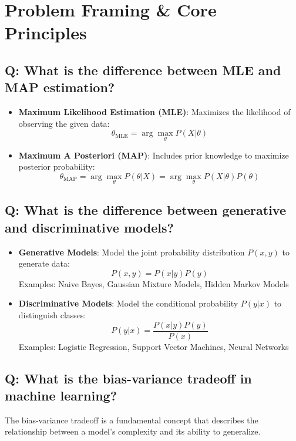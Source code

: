 \section{Problem Framing \& Core Principles}

\subsection*{\textcolor{primaryteal}{Q: What is the difference between MLE and MAP estimation?}}
\begin{itemize}
	\item \textbf{Maximum Likelihood Estimation (MLE)}: Maximizes the likelihood of observing the given data:
	      \[
		      \theta_{\text{MLE}} = \arg\max_{\theta} P(X|\theta)
	      \]
	\item \textbf{Maximum A Posteriori (MAP)}: Includes prior knowledge to maximize posterior probability:
	      \[
		      \theta_{\text{MAP}} = \arg\max_{\theta} P(\theta|X) = \arg\max_{\theta} P(X|\theta)P(\theta)
	      \]
\end{itemize}

\subsection*{\textcolor{primaryteal}{Q: What is the difference between generative and discriminative models?}}
\begin{itemize}
	\item \textbf{Generative Models}: Model the joint probability distribution $P(x, y)$ to generate data:
	      \[
		      P(x, y) = P(x|y)P(y)
	      \]
	      Examples: Naive Bayes, Gaussian Mixture Models, Hidden Markov Models

	\item \textbf{Discriminative Models}: Model the conditional probability $P(y|x)$ to distinguish classes:
	      \[
		      P(y|x) = \frac{P(x|y)P(y)}{P(x)}
	      \]
	      Examples: Logistic Regression, Support Vector Machines, Neural Networks
\end{itemize}

\subsection*{\textcolor{primaryteal}{Q: What is the bias-variance tradeoff in machine learning?}}
The bias-variance tradeoff is a fundamental concept that describes the relationship between a model's complexity and its ability to generalize.

